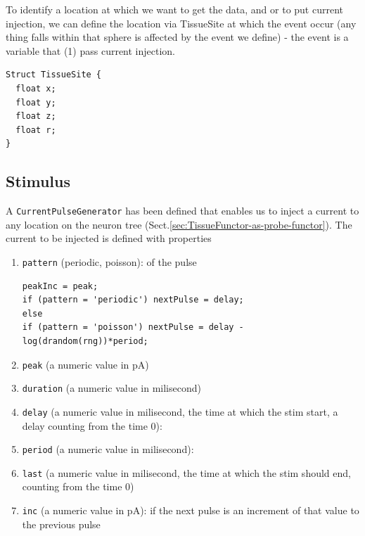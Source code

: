 To identify a location at which we want to get the data, and or to put current
injection, we can define the location via TissueSite at which the event
occur (any thing falls within that sphere is affected by the event we define) -
the event is a variable that (1) pass current injection.
\begin{verbatim}
Struct TissueSite {
  float x;
  float y;
  float z;
  float r;
}
\end{verbatim}

\subsection{Stimulus}

A \verb!CurrentPulseGenerator! has been defined that enables us to inject a
current to any location on the
neuron tree (Sect.\ref{sec:TissueFunctor-as-probe-functor}). The current to be
injected is defined with properties
\begin{enumerate}
  \item \verb!pattern! (periodic, poisson): of the pulse
  
\begin{verbatim}
peakInc = peak;
if (pattern = 'periodic') nextPulse = delay;
else
if (pattern = 'poisson') nextPulse = delay - log(drandom(rng))*period;
\end{verbatim}
  
  \item \verb!peak! (a numeric value in pA)
  
  \item \verb!duration! (a numeric value in milisecond)
  
  \item \verb!delay! (a numeric value in milisecond, the time at which the
  stim start, a delay counting from the time 0):  
  
  \item \verb!period! (a numeric value in milisecond): 
  
  
  \item \verb!last! (a numeric value in milisecond, the time at which the stim
  should end, counting from the time 0)
  
  \item \verb!inc! (a numeric value in pA): if the next pulse is an increment of
  that value to the previous pulse
\end{enumerate}

